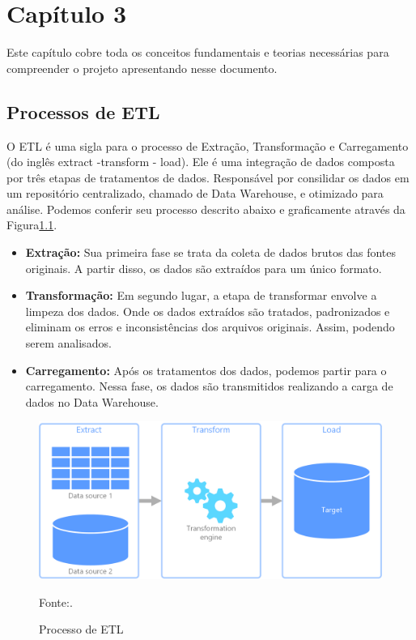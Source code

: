 \chapter{Capítulo 3}

Este capítulo cobre toda os conceitos fundamentais e teorias necessárias para compreender o projeto apresentando nesse documento.

\section{Processos de ETL}

O ETL é uma sigla para o processo de Extração, Transformação e Carregamento (do inglês extract -transform - load). Ele é uma integração de dados composta por três etapas de tratamentos de dados. Responsável por consilidar os dados em um repositório centralizado, chamado de Data Warehouse, e otimizado para análise. Podemos conferir seu processo descrito abaixo e graficamente através da Figura\ref{fig:etl_process}. \cite{ucommerce_etl}

\begin{itemize}
    \item \textbf{Extração:} Sua primeira fase se trata da coleta de dados brutos das fontes originais. A partir disso, os dados são extraídos para um único formato.
    \item \textbf{Transformação:} Em segundo lugar, a etapa de transformar envolve a limpeza dos dados. Onde os dados extraídos são tratados, padronizados e eliminam os erros e inconsistências dos arquivos originais. Assim, podendo serem analisados.
    \item \textbf{Carregamento:} Após os tratamentos dos dados, podemos partir para o carregamento. Nessa fase, os dados são transmitidos realizando a carga de dados no Data Warehouse.
\end{itemize}

\begin{figure}[H]
  \centering
  \caption{Processo de ETL}\label{fig:etl_process}
  \includegraphics[width=.6\linewidth]{imagens/etl.png}
  \par
  \footnotesize{Fonte:\cite{microsoft_etl}.}
\end{figure}

